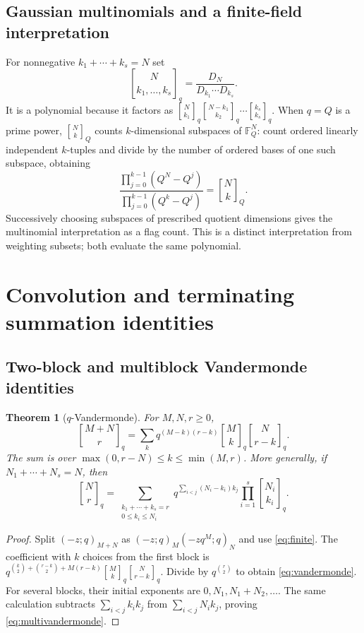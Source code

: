 \documentclass[11pt,a4paper]{article}
\numberwithin{equation}{section}
\newtheorem{theorem}{Theorem}[section]
\theoremstyle{definition}
\theoremstyle{remark}
\newcommand{\qb}[2]{\genfrac{[}{]}{0pt}{}{#1}{#2}_{q}}
\newcommand{\qbb}[3]{\genfrac{[}{]}{0pt}{}{#1}{#2}_{#3}}
\newcommand{\poch}[3]{(#1;#2)_{#3}}
\begin{document}
\subsection{Gaussian multinomials and a finite-field interpretation}
For nonnegative $k_1+\cdots+k_s=N$ set
\[
 \qbb{N}{k_1,\ldots,k_s}{q}=\frac{D_N}{D_{k_1}\cdots D_{k_s}}.
\]
It is a polynomial because it factors as
$\qb N{k_1}\qb{N-k_1}{k_2}\cdots\qb{k_s}{k_s}$.
When $q=Q$ is a prime power, $\qbb NkQ$ counts $k$-dimensional subspaces of
$\mathbb F_Q^N$: count ordered linearly independent $k$-tuples and divide by the
number of ordered bases of one such subspace, obtaining
\[
 \frac{\prod_{j=0}^{k-1}(Q^N-Q^j)}{\prod_{j=0}^{k-1}(Q^k-Q^j)}
 =\qbb NkQ.
\]
Successively choosing subspaces of prescribed quotient dimensions gives the
multinomial interpretation as a flag count. This is a distinct interpretation
from weighting subsets; both evaluate the same polynomial.

\section{Convolution and terminating summation identities}\label{sec:convolutions}

\subsection{Two-block and multiblock Vandermonde identities}
\begin{theorem}[$q$-Vandermonde]\label{thm:vandermonde}
For $M,N,r\ge0$,
\begin{equation}\label{eq:vandermonde}
 \qb{M+N}r
 =\sum_k q^{(M-k)(r-k)}\qb Mk\qb N{r-k}.
\end{equation}
The sum is over $\max(0,r-N)\le k\le\min(M,r)$.
More generally, if $N_1+\cdots+N_s=N$, then
\begin{equation}\label{eq:multivandermonde}
 \qb Nr=
 \sum_{\substack{k_1+\cdots+k_s=r\\0\le k_i\le N_i}}
 q^{\sum_{i<j}(N_i-k_i)k_j}\prod_{i=1}^s\qb{N_i}{k_i}.
\end{equation}
\end{theorem}
\begin{proof}
Split $\poch{-z}q{M+N}$ as $\poch{-z}qM\poch{-zq^M}qN$ and use
\eqref{eq:finite}. The coefficient with $k$ choices from the first block is
$q^{\binom k2+\binom{r-k}2+M(r-k)}\qb Mk\qb N{r-k}$.
Divide by $q^{\binom r2}$ to obtain \eqref{eq:vandermonde}.
For several blocks, their initial exponents are
$0,N_1,N_1+N_2,\ldots$. The same calculation subtracts
$\sum_{i<j}k_i k_j$ from $\sum_{i<j}N_i k_j$, proving
\eqref{eq:multivandermonde}.
\end{proof}
\end{document}
